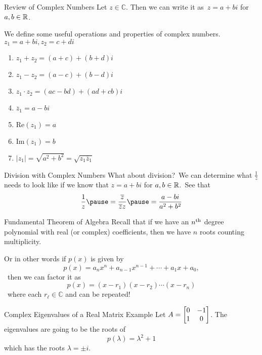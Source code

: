 \documentclass[xcoler=dvipsnames, aspectratio=169]{beamer}
\date{Complex Eigenvalues}
\newcommand{\C}{\mathbb{C}}
\renewcommand{\Re}[1]{\textrm{Re}\left(#1\right)}
\renewcommand{\Im}[1]{\textrm{Im}\left(#1\right)}
\begin{document}
    \begin{frame}{Review of Complex Numbers}
        Let $z\in\C$. Then we can write it as\pause\ $z = a+bi$ for $a,b\in\mathbb{R}$.\pause
        
        We define some useful operations and properties of complex numbers.
        $z_1=a+bi, z_2=c+di$
        \begin{enumerate}
            \pause\item $z_1+z_2 = (a+c) + (b+d)i$
            \pause\item $z_1-z_2 = (a-c) + (b-d)i$
            \pause\item $z_1\cdot z_2 = (ac-bd) + (ad + cb)i$
            \pause\item $\overline{z}_1 = a - bi$
            \pause\item $\Re{z_1} = a$
            \pause\item $\Im{z_1} = b$
            \pause\item $|z_1| = \sqrt{a^2 + b^2} = \sqrt{z_1\overline{z}_1}$
        \end{enumerate}
    \end{frame}
    \begin{frame}{Division with Complex Numbers}
        What about division?\pause\ We can determine what $\frac{1}{z}$ needs to look like
        if we know that $z = a+bi$ for $a,b\in\mathbb{R}$.\pause\ See that
        \[
            \frac{1}{z}\pause = \frac{\overline{z}}{\overline{z}z}\pause = 
            \frac{a-bi}{a^2+b^2}
        \]
    \end{frame}
    \begin{frame}{Fundamental Theorem of Algebra}
        Recall that if we have an $n^{\textnormal{th}}$ degree polynomial with real (or complex)
        coefficients, then we have $n$ roots counting multiplicity.\pause\ 

        Or in other words if $p(x)$ is given by
        \[
            p(x) = a_nx^n + a_{n-1}x^{n-1} + \cdots + a_1x + a_0,
        \]\pause\ then we can factor it as
        \[
            p(x) = (x-r_1)(x-r_2)\cdots (x-r_n)
        \]\pause\
        where each $r_\ell\in\C$ and can be repeated!
    \end{frame}
    \begin{frame}{Complex Eigenvalues of a Real Matrix Example}
        Let $A=\begin{bmatrix}
            0 & -1\\
            1 & 0
        \end{bmatrix}$. The eigenvalues are going to be the roots of 
        \[
            p(\lambda) = \lambda^2 + 1
        \]\pause
        which has the roots $\lambda = \pm i$. 
    \end{frame}
\end{document}
